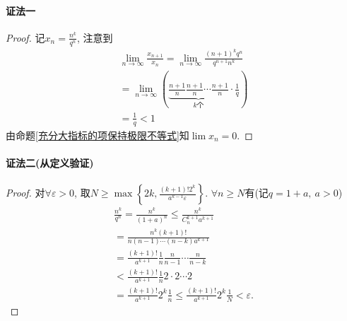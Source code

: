 \paragraph{证法一}
\begin{proof}
  记$x_n = \frac{n^{k}}{q^{n}}$, 注意到
  \begin{equation}
    \begin{gathered}
      \lim_{n \to \infty} \frac{x_{n+1}}{x_n} = \lim_{n \to \infty} \frac{\left( n+1 \right) ^{k} q^n}{q^{n+1} n^{k}}
      \\
      = \lim_{n \to \infty} \left( \underbrace{\frac{n+1}{n} \frac{n+1}{n} \cdots \frac{n+1}{n} }_{k \text{个}} \cdot \frac{1}{q}\right) 
      \\
      =\frac{1}{q} < 1
    \end{gathered}
  \end{equation}
  由命题\ref{充分大指标的项保持极限不等式}知$\lim x_n = 0$.
\end{proof}
\paragraph{证法二(从定义验证)}
\begin{proof}
  对$\forall \varepsilon>0$, 取$N \ge \max\left\{ 2k, \frac{(k+1)! 2^k}{a^{k-1} \varepsilon} \right\} $. $\forall n\ge N$有(记$q=1+a, \ a>0$)
  \begin{equation}
    \begin{gathered}
      \frac{n^{k}}{q^{n}} = \frac{n^{k}}{(1+a)^{n}} \le  \frac{n^{k}}{C^{k+1}_{n} a^{k+1}}
      \\
      = \frac{n^{k} (k+1)!}{n(n-1)\cdots (n-k) a^{k+1}}
      \\
      = \frac{(k+1)!}{a^{k+1}} \frac{1}{n} \frac{n}{n-1} \cdots \frac{n}{n-k}
      \\
      < \frac{(k+1)!}{a^{k+1}} \frac{1}{n} 2\cdot 2 \cdots 2
      \\
      = \frac{(k+1)!}{a^{k+1}} 2^k \frac{1}{n} \le \frac{(k+1)!}{a^{k+1}} 2^k \frac{1}{N} < \varepsilon.
    \end{gathered}
  \end{equation}
\end{proof}


